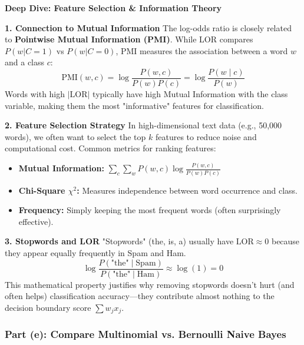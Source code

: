 \documentclass[12pt]{article}
\begin{document}
\begin{explanation}
\textbf{Deep Dive: Feature Selection \& Information Theory}

\textbf{1. Connection to Mutual Information}
The log-odds ratio is closely related to \textbf{Pointwise Mutual Information (PMI)}.
While LOR compares $P(w|C=1)$ vs $P(w|C=0)$, PMI measures the association between a word $w$ and a class $c$:
\[
\text{PMI}(w, c) = \log \frac{P(w, c)}{P(w)P(c)} = \log \frac{P(w \mid c)}{P(w)}
\]
Words with high $|\text{LOR}|$ typically have high Mutual Information with the class variable, making them the most "informative" features for classification.

\textbf{2. Feature Selection Strategy}
In high-dimensional text data (e.g., 50,000 words), we often want to select the top $k$ features to reduce noise and computational cost.
Common metrics for ranking features:
\begin{itemize}
    \item \textbf{Mutual Information:} $\sum_c \sum_w P(w,c) \log \frac{P(w,c)}{P(w)P(c)}$
    \item \textbf{Chi-Square $\chi^2$:} Measures independence between word occurrence and class.
    \item \textbf{Frequency:} Simply keeping the most frequent words (often surprisingly effective).
\end{itemize}

\textbf{3. Stopwords and LOR}
"Stopwords" (the, is, a) usually have $\text{LOR} \approx 0$ because they appear equally frequently in Spam and Ham.
\[
\log \frac{P(\text{"the"} \mid \text{Spam})}{P(\text{"the"} \mid \text{Ham})} \approx \log(1) = 0
\]
This mathematical property justifies why removing stopwords doesn't hurt (and often helps) classification accuracy—they contribute almost nothing to the decision boundary score $\sum w_j x_j$.
\end{explanation}

\subsubsection{Part (e): Compare Multinomial vs. Bernoulli Naive Bayes}
\end{document}
